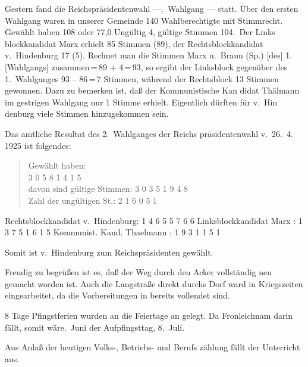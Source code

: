 

%
Gestern fand die Reichspräsidentenwahl —.\ Wahlgang — statt. Über den ersten Wahlgang\ob
waren in unserer Gemeinde 140 Wahlberechtigte mit\ob
Stimmrecht. Gewählt haben 108 oder 77,0%
Ungültig 4, gültige Stimmen 104.\ Der Links\ohb
blockkandidat Marx erhielt 85 Stimmen (89), der\ob
Rechtsblockkandidat v.\ Hindenburg 17 (5). Rechnet\ob
man die Stimmen Marx u.\ Braun (Sp.) {[des]} 1. {[Wahlgangs]}\ob
zusammen\,=\,89 + 4\,=\,93, so ergibt der Linksblock\ob
gegenüber des 1.\ Wahlganges 93 – 86\,=\,7 Stimmen,\ob
während der Rechtsblock 13 Stimmen gewonnen.\ob
Dazu zu bemerken ist, daß der Kommunistische Kan\ohb
didat Thälmann im gestrigen Wahlgang nur 1\ob
Stimme erhielt. Eigentlich dürften für v.\ Hin\ohb
denburg viele Stimmen hinzugekommen sein.

%
Das amtliche Resultat des 2.\ Wahlganges der Reichs\ohb
präsidentenwahl v.\ 26.\ 4. 1925 ist folgendes:

\pend
\begin{verse}
Gewählt haben:\\
3 0 5 8 1 4 1 5\\
davon sind gültige Stimmen: 3 0 3 5 1 9 4 8\\
Zahl der ungültigen St.:      2 1 6 0 5 1
\end{verse}
\pstart

Rechtsblockkandidat v.\ Hindenburg: 1 4 6 5 5 7 6 6\ob
Linksblockkandidat Marx           : 1 3 7 5 1 6 1 5\ob
Kommunist. Kand. Thaelmann        :   1 9 3 1 1 5 1

Somit ist v.\ Hindenburg zum Reichspräsidenten\ob
gewählt.

%
Freudig zu begrüßen ist es, daß der Weg durch den\ob
Acker vollständig neu gemacht worden ist. Auch die\ob
Langstraße direkt durchs Dorf ward in Kriegszeiten\ob
eingearbeitet, da die Vorbereitungen in\ob
\unsicher bereits vollendet sind.

%
8 Tage Pfingstferien wurden an die Feiertage an\ohb
gelegt. Da Fronleichnam darin fällt, somit wäre.\ Juni der Aufpfingsttag, 8.\ Juli.

%
Aus Anlaß der heutigen Volks-, Betriebs- und Berufs\ohb
zählung fällt der Unterricht aus.
\pend
